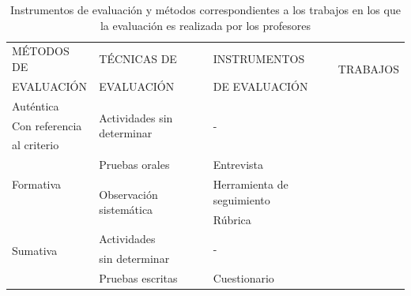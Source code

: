 \begin{table}
  \begin{center}
  \begin{tabular}{| m{3cm} | m{3cm} | m{3.5cm} | m{2cm} |}
    \hline
    MÉTODOS DE  & TÉCNICAS DE  & INSTRUMENTOS  & \multirow{2}{*}{TRABAJOS} \\
    EVALUACIÓN & EVALUACIÓN & DE EVALUACIÓN &  \\
    \hline
    \hline
     Auténtica & \multirow{3}{3.5cm}{Actividades sin determinar} & \multirow{3}{*}{-}  & \cite{starcic2008sustaining} \\
    \cline{1-1} \cline{4-4}
     Con referencia &  &   & \multirow{2}{*}{\cite{serrano2013hiperion}} \\
     al criterio &  &   &  \\
    \hline
     \multirow{4}{*}{Formativa} & Pruebas orales & Entrevista & \cite{ward2011developing} \\
    \cline{2-4}
     & \multirow{4}{3.5cm}{Observación sistemática } & \multirow{2}{3.5cm}{Herramienta de seguimiento} & \multirow{2}{*}{\cite{benlloch2007adapting,lacuesta2009active}} \\
     &  &  & \\
    \cline{3-4}
      &  & \multirow{2}{*}{Rúbrica} & \cite{rodriguez2010portfolio} \\
    \cline{1-1} \cline{4-4}
     \multirow{4}{*}{Sumativa} &    &  & \cite{aziz2007appraisal,martin2013acquired,rashid2008engineering} \\
    \cline{2-4}
      & Actividades  & \multirow{2}{*}{-}  & \multirow{2}{*}{\cite{yang2014fine}} \\
      &  sin determinar &   &  \\
    \cline{2-4}
      & Pruebas escritas & Cuestionario & \cite{vizcarro2013assessment} \\
    \hline
    \end{tabular}
\end{center}
\caption{Instrumentos de evaluación y métodos correspondientes a los trabajos en los que la evaluación es realizada por los profesores}
\label{tab:MetodosProfesor}
\end{table} 

